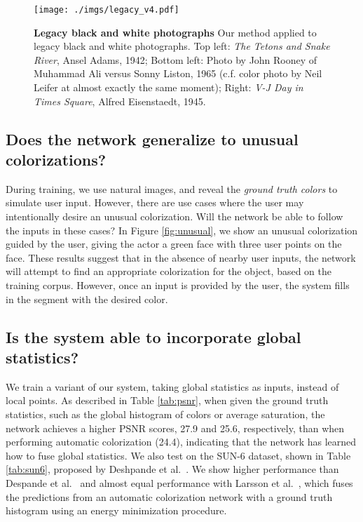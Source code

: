 \documentclass[acmtog,authorversion]{acmart}
\begin{document}
\begin{figure*}[t!]
\texttt{[image: ./imgs/legacy\_v4.pdf]}
\vspace{-6mm}
\caption{\textbf{Legacy black and white photographs} Our method applied to legacy black and white photographs. Top left: \emph{The Tetons and Snake River}, Ansel Adams, 1942; Bottom left: Photo by John Rooney of Muhammad Ali versus Sonny Liston, 1965 (c.f. color photo by Neil Leifer at almost exactly the same moment); Right: \emph{V-J Day in Times Square}, Alfred Eisenstaedt, 1945.
}
\label{fig:legacy_res}
\end{figure*}

\subsection{Does the network generalize to unusual colorizations?}
\label{sec:unusual}

During training, we use natural images, and reveal the \textit{ground truth colors} to simulate user input. However, there are use cases where the user may intentionally desire an unusual colorization. Will the network be able to follow the inputs in these cases? In Figure \ref{fig:unusual}, we show an unusual colorization guided by the user, giving the actor a green face with three user points on the face. These results suggest that in the absence of nearby user inputs, the network will attempt to find an appropriate colorization for the object, based on the training corpus. However, once an input is provided by the user, the system fills in the segment with the desired color.

\vspace{-2mm}
\subsection{Is the system able to incorporate global statistics?}
\label{sec:expr_global}

We train a variant of our system, taking global statistics as inputs, instead of local points. As described in Table \ref{tab:psnr}, when given the ground truth statistics, such as the global histogram of colors or average saturation, the network achieves a higher PSNR scores, 27.9 and 25.6, respectively, than when performing automatic colorization (24.4), indicating that the network has learned how to fuse global statistics. We also test on the SUN-6 dataset, shown in Table \ref{tab:sun6}, proposed by Deshpande et al.~. We show higher performance than Despande et al.~ and almost equal performance with Larsson et al.~, which fuses the predictions from an automatic colorization network with a ground truth histogram using an energy minimization procedure.
\end{document}
